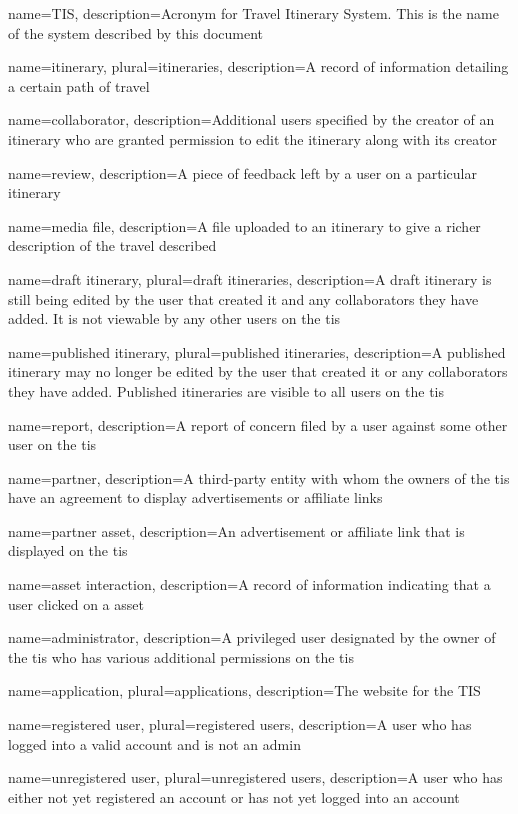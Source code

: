 \makeglossaries

{
    name=TIS,
    description={Acronym for Travel Itinerary System. This is the name of the system described by this document}
}

{
    name=itinerary,
    plural=itineraries,
    description={A record of information detailing a certain path of travel}
}

{
    name=collaborator,
    description={Additional users specified by the creator of an \gls{itinerary} who are granted permission to edit the \gls{itinerary} along with its creator}
}

{
    name=review,
    description={A piece of feedback left by a user on a particular \gls{itinerary}}
}

{
    name=media file,
    description={A file uploaded to an \gls{itinerary} to give a richer description of the travel described}
}

{
    name={draft itinerary},
    plural={draft itineraries},
    description={A draft \gls{itinerary} is still being edited by the user that created it and any \glspl{collaborator} they have added. It is not viewable by any other users on the \gls{tis}}
}

{
    name={published itinerary},
    plural={published itineraries},
    description={A published \gls{itinerary} may no longer be edited by the user that created it or any \glspl{collaborator} they have added. Published itineraries are visible to all users on the \gls{tis}}
}

{
    name=report,
    description={A report of concern filed by a user against some other user on the \gls{tis}}
}

{
    name=partner,
    description={A third-party entity with whom the owners of the \gls{tis} have an agreement to display advertisements or affiliate links}
}

{
    name={partner asset},
    description={An advertisement or affiliate link that is displayed on the \gls{tis}}
}

{
    name={asset interaction},
    description={A record of information indicating that a user clicked on a \gls{asset}}
}

{
    name=administrator,
    description={A privileged user designated by the owner of the \gls{tis} who has various additional permissions on the \gls{tis}}
}

{
    name=application,
    plural=applications,
    description={The website for the TIS}
}

{
    name={registered user},
    plural={registered users},
    description={A user who has logged into a valid account and is not an \gls{admin}}
}

{
    name={unregistered user},
    plural={unregistered users},
    description={A user who has either not yet registered an account or has not yet logged into an account}
}